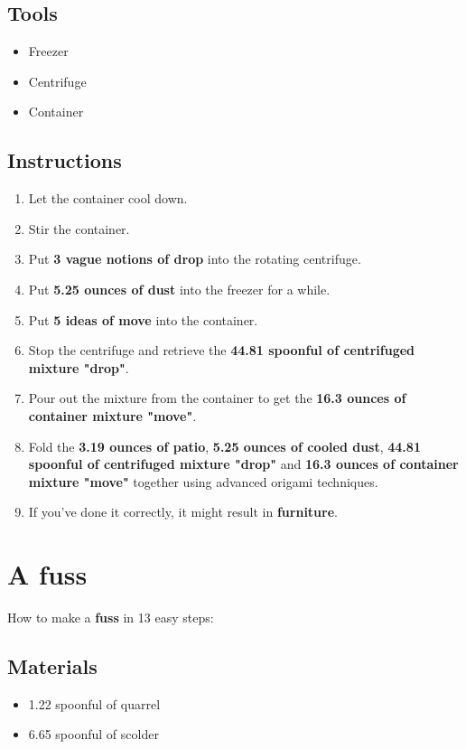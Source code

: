 \documentclass{article}
\begin{document}
\subsection{Tools}\begin{itemize}
\item 
Freezer
\item 
Centrifuge
\item 
Container
\end{itemize}
\subsection{Instructions}\begin{enumerate}
\item 
Let the container cool down.
\item 
Stir the container.
\item 
Put \textbf{3 vague notions of drop} into the rotating centrifuge.
\item 
Put \textbf{5.25 ounces of dust} into the freezer for a while.
\item 
Put \textbf{5 ideas of move} into the container.
\item 
Stop the centrifuge and retrieve the \textbf{44.81 spoonful of centrifuged mixture "drop"}.
\item 
Pour out the mixture from the container to get the \textbf{16.3 ounces of container mixture "move"}.
\item 
Fold the \textbf{3.19 ounces of patio}, \textbf{5.25 ounces of cooled dust}, \textbf{44.81 spoonful of centrifuged mixture "drop"} and \textbf{16.3 ounces of container mixture "move"} together using advanced origami techniques.
\item 
If you've done it correctly, it might result in \textbf{furniture}.
\end{enumerate}
\newpage
\section{A fuss}How to make a \textbf{fuss} in 13 easy steps:

\subsection{Materials}\begin{itemize}
\item 
1.22 spoonful of quarrel
\item 
6.65 spoonful of scolder
\end{itemize}
\end{document}
